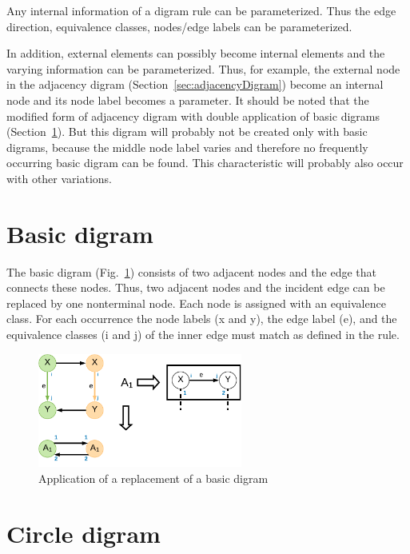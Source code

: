 \documentclass[a4paper]{scrartcl}
\begin{document}
Any internal information of a digram rule can be parameterized. Thus the edge direction, equivalence classes, nodes/edge labels can be parameterized.

In addition, external elements can possibly become internal elements and the varying information can be parameterized. Thus, for example, the external node in the adjacency digram (Section~\ref{sec:adjacencyDigram}) become an internal node and its node label becomes a parameter.
It should be noted that the modified form of adjacency digram with double application of basic digrams (Section~\ref{sec:basicDigram}). But this digram will probably not be created only with basic digrams, because the middle node label varies and therefore no frequently occurring basic digram can be found. This characteristic will probably also occur with other variations.




\section{Basic digram}
\label{sec:basicDigram}


The basic digram (Fig.~\ref{fig:basicDigram}) consists of two adjacent nodes and the edge that connects these nodes. Thus, two adjacent nodes and the incident edge can be replaced by one nonterminal node. Each node is assigned with an equivalence class. For each occurrence the node labels (x and y), the edge label (e), and the equivalence classes (i and j) of the inner edge must match as defined in the rule.

\begin{figure}[h]
	\centering
	\includegraphics[width=0.6\textwidth]{img/basicDigram}
	\caption{Application of a replacement of a basic digram}
	\label{fig:basicDigram}
\end{figure}

\section{Circle digram}
\label{sec:circleDigram}
\end{document}
